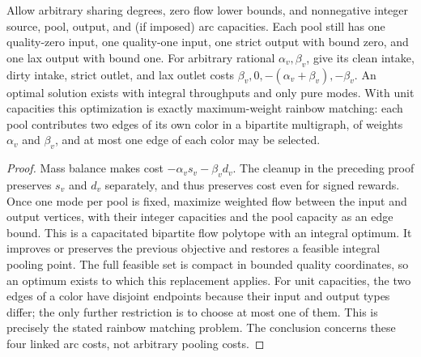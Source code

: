 \begin{proposition}\label{s3:weighted}
Allow arbitrary sharing degrees, zero flow lower bounds, and nonnegative
integer source, pool, output, and (if imposed) arc capacities. Each pool
still has one quality-zero input, one
quality-one input, one strict output with bound zero, and one lax output
with bound one. For arbitrary rational $\alpha_v,\beta_v$, give its clean
intake, dirty intake, strict outlet, and lax outlet costs
$\beta_v,0,-(\alpha_v+\beta_v),-\beta_v$. An optimal solution exists
with integral throughputs and only pure modes. With unit capacities
this optimization is exactly maximum-weight rainbow matching: each
pool contributes two edges of its own color in a bipartite multigraph, of weights $\alpha_v$
and $\beta_v$, and at most one edge of each color may be selected.
\end{proposition}
\begin{proof}
Mass balance makes cost $-\alpha_vs_v-\beta_vd_v$. The cleanup in the
preceding proof preserves $s_v$ and $d_v$ separately, and thus preserves
cost even for signed rewards. Once one mode per pool is fixed, maximize
weighted flow between the input and output vertices, with their integer
capacities and the pool capacity as an edge bound. This is a capacitated
bipartite flow polytope with an integral optimum. It improves or preserves
the previous objective and restores a feasible integral pooling point.
The full feasible set is compact in bounded quality coordinates, so an
optimum exists to which this replacement applies. For unit capacities,
the two edges of a color have disjoint endpoints because their input and
output types differ; the only further restriction is to choose at most
one of them. This is precisely the stated rainbow matching problem.
The conclusion concerns these four linked arc costs, not arbitrary
pooling costs.
\end{proof}

